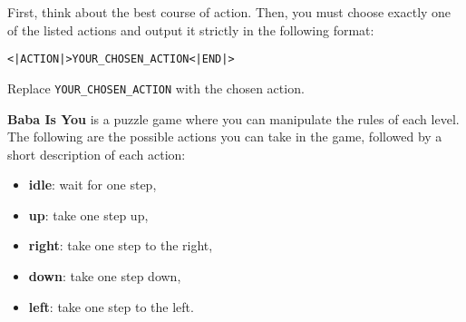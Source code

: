 \begin{GreenBox}[frametitle={\textbf{Iteration 2 Baba-is-ai Prompt}}]
First, think about the best course of action.  
Then, you must choose exactly one of the listed actions and output it strictly in the following format:

\texttt{<|ACTION|>YOUR\_CHOSEN\_ACTION<|END|>}

Replace \texttt{YOUR\_CHOSEN\_ACTION} with the chosen action.

\end{GreenBox}
\newpage

\begin{GreenBox}[frametitle={\textbf{Iteration 3 Baba-is-ai Prompt}}]

\textbf{Baba Is You} is a puzzle game where you can manipulate the rules of each level. The following are the possible actions you can take in the game, followed by a short description of each action:

\begin{itemize}
    \item \textbf{idle}: wait for one step,
    \item \textbf{up}: take one step up,
    \item \textbf{right}: take one step to the right,
    \item \textbf{down}: take one step down,
    \item \textbf{left}: take one step to the left.
\end{itemize}


\end{GreenBox}
